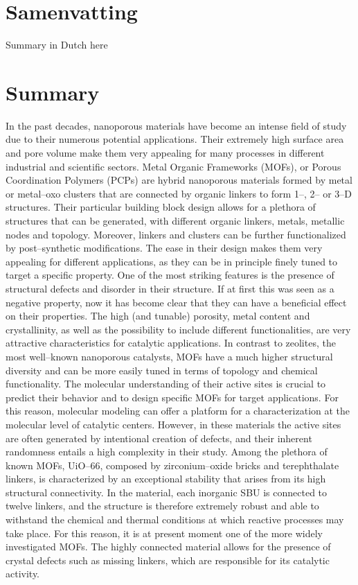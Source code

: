 \chapter{Samenvatting}
Summary in Dutch here

\chapter{Summary}
In the past decades, nanoporous materials have become an intense field of study due to their numerous potential applications. Their extremely high surface area and pore volume make them very appealing for many processes in different industrial and scientific sectors.
\npar
Metal Organic Frameworks (MOFs), or Porous Coordination Polymers (PCPs) are hybrid nanoporous materials formed by metal or metal--oxo clusters that are connected by organic linkers to form 1--, 2-- or 3--D structures. Their particular building block design allows for a plethora of structures that can be generated, with different organic linkers, metals, metallic nodes and topology. Moreover, linkers and clusters can be further functionalized by post--synthetic modifications. The ease in their design makes them very appealing for different applications, as they can be in principle finely tuned to target a specific property. One of the most striking features is the presence of structural defects and disorder in their structure. If at first this was seen as a negative property, now it has become clear that they can have a beneficial effect on their properties. 
\npar
The high (and tunable) porosity, metal content and crystallinity, as well as the possibility to include different functionalities, are very attractive characteristics for catalytic applications. In contrast to zeolites, the most well--known nanoporous catalysts, MOFs have a much higher structural diversity and can be more easily tuned in terms of topology and chemical functionality. The molecular understanding of their active sites is crucial to predict their behavior and to design specific MOFs for target applications. 
\npar
For this reason, molecular modeling can offer a platform for a characterization at the molecular level of catalytic centers. However, in these materials the active sites are often generated by intentional creation of defects, and their inherent randomness entails a high complexity in their study.
\npar
Among the plethora of known MOFs, UiO--66, composed by zirconium--oxide bricks and terephthalate linkers, is characterized by an exceptional stability that arises from its high structural connectivity. In the material, each inorganic SBU is connected to twelve linkers, and the structure is therefore extremely robust and able to withstand the chemical and thermal conditions at which reactive processes may take place. For this reason, it is at present moment one of the more widely investigated MOFs. The highly connected material allows for the presence of crystal defects such as missing linkers, which are responsible for its catalytic activity. 
\npar



